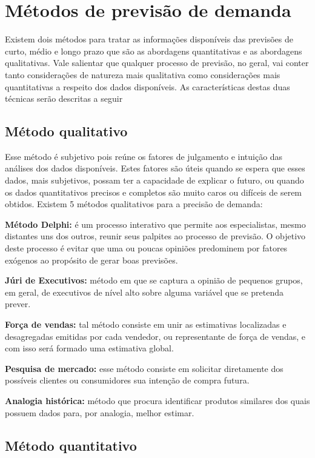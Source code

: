 \section{Métodos de previsão de demanda}

Existem dois métodos para tratar as informações disponíveis das previsões de curto, médio e longo prazo que são as abordagens quantitativas e as abordagens qualitativas. Vale salientar que qualquer processo de previsão, no geral, vai conter tanto considerações de natureza mais qualitativa como considerações mais quantitativas a respeito dos dados disponíveis. As características destas duas técnicas serão descritas a seguir

\subsection{Método qualitativo}

Esse método é subjetivo pois reúne os fatores de julgamento e intuição das análises dos dados disponíveis. Estes fatores são úteis quando se espera que esses dados, mais subjetivos, possam ter a capacidade de explicar o futuro, ou quando os dados quantitativos precisos e completos são muito caros ou difíceis de serem obtidos. Existem 5 métodos qualitativos para a precisão de demanda:

\textbf{Método Delphi:} é um processo interativo que permite aos especialistas, mesmo distantes uns dos outros, reunir seus palpites ao processo de previsão. O objetivo deste processo é evitar que uma ou poucas opiniões predominem por fatores exógenos ao propósito de gerar boas previsões.

\textbf{Júri de Executivos:} método em que se captura a opinião de pequenos grupos, em geral, de executivos de nível alto sobre alguma variável que se pretenda prever.

\textbf{Força de vendas:} tal método consiste em unir as estimativas localizadas e desagregadas emitidas por cada vendedor, ou representante de força de vendas, e com isso será formado uma estimativa global.

\textbf{Pesquisa de mercado:} esse método consiste em solicitar diretamente dos possíveis clientes ou consumidores sua intenção de compra futura.

\textbf{Analogia histórica:} método que procura identificar produtos similares dos quais possuem dados para, por analogia, melhor estimar. %

\subsection{Método quantitativo}

